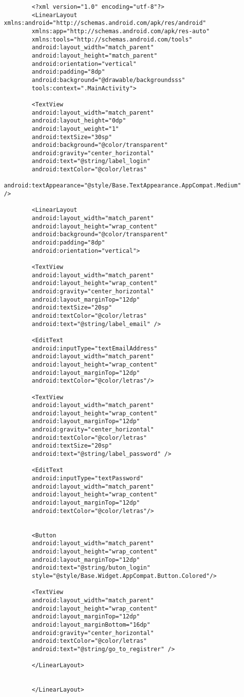 \documentclass[a4paper]{article}
\begin{document}
	\begin{lstlisting}
		<?xml version="1.0" encoding="utf-8"?>
		<LinearLayout xmlns:android="http://schemas.android.com/apk/res/android"
		xmlns:app="http://schemas.android.com/apk/res-auto"
		xmlns:tools="http://schemas.android.com/tools"
		android:layout_width="match_parent"
		android:layout_height="match_parent"
		android:orientation="vertical"
		android:padding="8dp"
		android:background="@drawable/backgroundsss"
		tools:context=".MainActivity">
		
		<TextView
		android:layout_width="match_parent"
		android:layout_height="0dp"
		android:layout_weight="1"
		android:textSize="30sp"
		android:background="@color/transparent"
		android:gravity="center_horizontal"
		android:text="@string/label_login"
		android:textColor="@color/letras"
		android:textAppearance="@style/Base.TextAppearance.AppCompat.Medium" />
		
		<LinearLayout
		android:layout_width="match_parent"
		android:layout_height="wrap_content"
		android:background="@color/transparent"
		android:padding="8dp"
		android:orientation="vertical">
		
		<TextView
		android:layout_width="match_parent"
		android:layout_height="wrap_content"
		android:gravity="center_horizontal"
		android:layout_marginTop="12dp"
		android:textSize="20sp"
		android:textColor="@color/letras"
		android:text="@string/label_email" />
		
		<EditText
		android:inputType="textEmailAddress"
		android:layout_width="match_parent"
		android:layout_height="wrap_content"
		android:layout_marginTop="12dp"
		android:textColor="@color/letras"/>
		
		<TextView
		android:layout_width="match_parent"
		android:layout_height="wrap_content"
		android:layout_marginTop="12dp"
		android:gravity="center_horizontal"
		android:textColor="@color/letras"
		android:textSize="20sp"
		android:text="@string/label_password" />
		
		<EditText
		android:inputType="textPassword"
		android:layout_width="match_parent"
		android:layout_height="wrap_content"
		android:layout_marginTop="12dp"
		android:textColor="@color/letras"/>
		
		
		<Button
		android:layout_width="match_parent"
		android:layout_height="wrap_content"
		android:layout_marginTop="12dp"
		android:text="@string/buton_login"
		style="@style/Base.Widget.AppCompat.Button.Colored"/>
		
		<TextView
		android:layout_width="match_parent"
		android:layout_height="wrap_content"
		android:layout_marginTop="12dp"
		android:layout_marginBottom="16dp"
		android:gravity="center_horizontal"
		android:textColor="@color/letras"
		android:text="@string/go_to_registrer" />
		
		</LinearLayout>
		
		
		</LinearLayout>
	\end{lstlisting}
	
\end{document}
